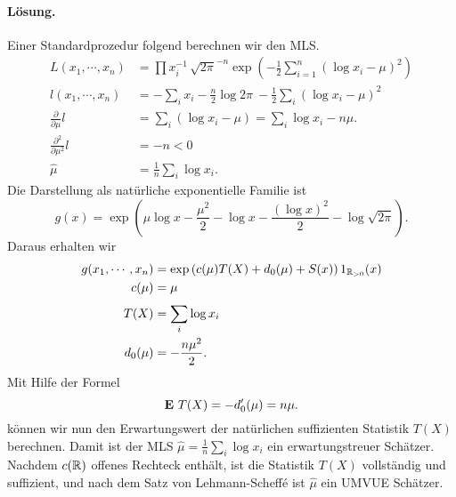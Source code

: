 \paragraph*{Lösung. } Einer Standardprozedur folgend berechnen wir den MLS. 
\begin{align*}
    L(x_1, \cdots, x_n) &= \prod x_i^{-1} \, \sqrt{2 \pi}^{-n} 
    \exp \left( - \frac{1}{2} \sum_{i=1}^{n} \left( \log x_i - \mu \right)^2 \right) \\
    l(x_1, \cdots, x_n) &= - \sum_{i}^{} x_i - \frac{n}{2} \log 2\pi \ -\frac{1}{2} \sum_{i}^{} \left( \log x_i -\mu \right)^2 \\
    \frac{\partial}{\partial \mu} l &= \sum_{i}^{} \left( \log x_i -\mu \right) = \sum_{i}^{} \log x_i - n\mu. \\
    \frac{\partial^2}{\partial \mu^2} l &= -n <0 \\
    \hat \mu &= \frac{1}{n} \sum_{i}^{} \log x_i.
\end{align*}
Die Darstellung als natürliche exponentielle Familie ist
\begin{equation*}
    g(x) = \exp \left( \mu \log x - \frac{\mu^2}{2} - \log x - \frac{\left( \log x \right)^2}{2} - \log \sqrt{2\pi} \right).
\end{equation*}
Daraus erhalten wir
\begin{align*}
    g(x_1, \cdots, x_n) &= \exp \left( c(\mu) T(X) + d_0 (\mu) + S(x) \right) 1_{\mathbb R_{>0}}(x) \\
    c(\mu) &= \mu \\
    T(X) &= \sum_{i}^{} \log x_i \\
    d_0(\mu) &= - \frac{n \mu^2}{2}.
\end{align*}
Mit Hilfe der Formel 
\begin{equation*}
    \mathbf{E}\ T(X) = - d_0'(\mu) = n \mu. 
\end{equation*}
können wir nun den Erwartungswert der natürlichen suffizienten Statistik $T(X)$
berechnen.  Damit ist der MLS $\hat \mu = \frac{1}{n} \sum_{i}^{} \log x_i$ ein
erwartungstreuer Schätzer. Nachdem $c(\mathbb R)$ offenes Rechteck enthält, ist die
Statistik $T(X)$ vollständig und suffizient, und nach dem Satz von
Lehmann-Scheff\'e ist $\hat \mu$ ein UMVUE Schätzer. 





